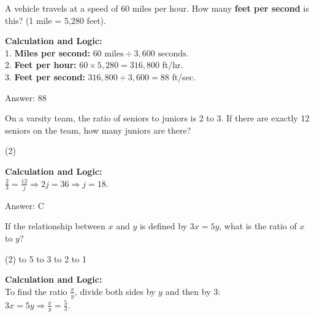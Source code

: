 \documentclass[11pt,paper=a4,answers]{exam}
\begin{document}
\begin{questions}
\vspace{60pt}

\question
A vehicle travels at a speed of 60 miles per hour. How many \textbf{feet per second} is this? (1 mile = 5,280 feet).

\begin{solution}
\textbf{Calculation and Logic:} \\
1. \textbf{Miles per second:} $60 \text{ miles} \div 3,600 \text{ seconds}$. \\
2. \textbf{Feet per hour:} $60 \times 5,280 = 316,800$ ft/hr. \\
3. \textbf{Feet per second:} $316,800 \div 3,600 = 88$ ft/sec.

\vspace{30pt}

Answer: \colorbox{yellow!100}{88}
\end{solution}

\vspace{60pt}

\question
On a varsity team, the ratio of seniors to juniors is 2 to 3. If there are exactly 12 seniors on the team, how many juniors are there?
\begin{tasks}(2)
\end{tasks}

\begin{solution}
\textbf{Calculation and Logic:} \\
$\frac{2}{3} = \frac{12}{j} \Rightarrow 2j = 36 \Rightarrow j = 18$.

\vspace{30pt}

Answer: \colorbox{yellow!100}{C}
\end{solution}

\vspace{60pt}

\question
If the relationship between $x$ and $y$ is defined by $3x = 5y$, what is the ratio of $x$ to $y$?
\begin{tasks}(2)
     to 5
     to 3
     to 2
     to 1
\end{tasks}

\begin{solution}
\textbf{Calculation and Logic:} \\
To find the ratio $\frac{x}{y}$, divide both sides by $y$ and then by 3: \\
$3x = 5y \Rightarrow \frac{x}{y} = \frac{5}{3}$.


\end{solution}
\end{questions}
\end{document}
